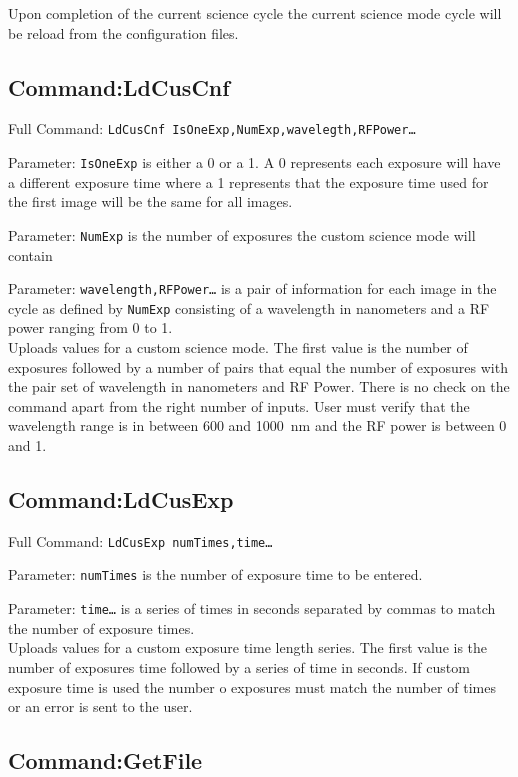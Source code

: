 Upon completion of the current science cycle the current science mode cycle will be reload from the configuration files.

\subsection{Command:LdCusCnf}

Full Command: \texttt{LdCusCnf IsOneExp,NumExp,wavelegth,RFPower\ldots}

Parameter: \texttt{IsOneExp} is either a 0 or a 1. A 0 represents each exposure will have a different exposure time where a 1 represents that the exposure time used for the first image will be the same for all images.

Parameter: \texttt{NumExp} is the number of exposures the custom science mode will contain

Parameter: \texttt{wavelength,RFPower\ldots} is a pair of information for each image in the cycle as defined by \texttt{NumExp} consisting of a wavelength in nanometers and a RF power ranging from 0 to 1.\\

Uploads values for a custom science mode. The first value is the number of exposures followed by a number of pairs that equal the number of exposures with the pair set of wavelength in nanometers and RF Power. There is no check on the command apart from the right number of inputs. User must verify that the wavelength range is in between 600 and 1000~nm and the RF power is between 0 and 1.

\subsection{Command:LdCusExp}

Full Command: \texttt{LdCusExp numTimes,time\ldots}

Parameter: \texttt{numTimes} is the number of exposure time to be entered.

Parameter: \texttt{time\ldots} is a series of times in seconds separated by commas to match the number of exposure times.\\

Uploads values for a custom exposure time length series. The first value is the number of exposures time followed by a series of time in seconds. If custom exposure time is used the number o exposures must match the number of times or an error is sent to the user.

\subsection{Command:GetFile}

